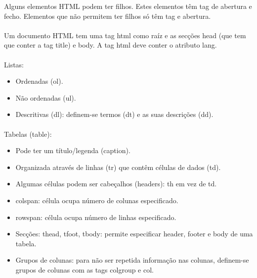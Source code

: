 \documentclass[../resumosLTW.tex]{subfiles}
\begin{document}
 

Alguns elementos HTML podem ter filhos. Estes elementos têm tag de abertura e fecho. Elementos que não permitem ter filhos só têm tag e abertura.

\paragraph{}

Um documento HTML tem uma tag html como raíz e as secções head (que tem que conter a tag title) e body. A tag html deve conter o atributo lang.

\paragraph{}

Listas:
\begin{itemize}
    \item Ordenadas (ol).
    \item Não ordenadas (ul).
    \item Descritivas (dl): definem-se termos (dt) e as suas descrições (dd).
\end{itemize}

\paragraph{}

Tabelas (table):
\begin{itemize}
    \item Pode ter um título/legenda (caption).
    \item Organizada através de linhas (tr) que contêm células de dados (td).
    \item Algumas células podem ser cabeçalhos (headers): th em vez de td.
    \item colspan: célula ocupa número de colunas especificado.
    \item rowspan: célula ocupa número de linhas especificado.
    \item Secções: thead, tfoot, tbody: permite especificar header, footer e body de uma tabela.
    \item Grupos de colunas: para não ser repetida informação nas colunas, definem-se grupos de colunas com as tags colgroup e col.
\end{itemize}

\paragraph{}
\end{document}
